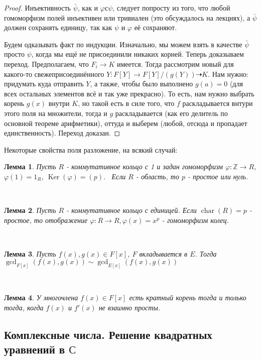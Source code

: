 \documentclass[a4paper,100pt]{article}
\theoremstyle{indented}
\newtheorem{lemma}{Лемма}
\theoremstyle{definition}
\theoremstyle{remark}
\DeclareMathOperator{\Ker}{Ker}
\DeclareMathOperator{\chard}{char}
\begin{document}
\begin{proof}
    Инъективность $\bar{\psi}$, как и $\varphi с \psi$, следует попросту из того, что любой гомоморфизм полей инъективен или тривиален (это обсуждалось на лекциях), а $\bar{\psi}$ должен сохранять единицу, так как $\psi$ и $\varphi$ её сохраняют.\ 

    Будем одказывать факт по индукции. Изначально, мы можем взять в качестве $\bar{\psi}$ просто $\psi$, когда мы ещё не присоединили никаких корней. Теперь доказываем переход. Предполагаем, что $F_i\rightarrow K$ имеется. Тогда рассмотрим новый для какого-то свежеприсоединённого $Y: F[Y]\rightarrow F[Y]/(g(Y))\dashrightarrow K$. Нам нужно: придумать куда отправить $Y$, а также, чтобы было выполнено $g(a)=0$ (для всех остальных элементов всё и так уже прекрасно). То есть, нам нужно выбрать корень $g(x)$ внутри $K$, но такой есть в силе того, что $f$ раскладывается внтури этого поля на множители, тогда и $g$ раскладывается (как его делитель по основной теореме арифметики), оттуда и выберем (любой, отсюда и пропадает единственность). Переход доказан.
\end{proof}

Некоторые свойства поля разложение, на всякий случай:\\

\begin{lemma}
    Пусть $R$ - коммутативное кольцо с 1 и задан гомоморфизм $\varphi: \mathbb{Z}\rightarrow R$, $\varphi(1)=1_R$, $\Ker(\varphi)=(p)$.  Если $R$ - область, то $p$ - простое или нуль.
\end{lemma}\

\begin{lemma}
    Пусть $R$ - коммутативное кольцо с единицей. Если $\chard (R)=p$ - простое, то отображение $\varphi: R\rightarrow R, \varphi(x)=x^p$ - гомоморфизм колец.
\end{lemma}\

\begin{lemma}
    Пусть $f(x), g(x)\in F[x]$, $F$ вкладывается в $E$. Тогда $\gcd_{F[x]}(f(x), g(x))\sim \gcd_{E[x]}(f(x), g(x))$
\end{lemma}\

\begin{lemma}
    У многочлена $f(x)\in F[x]$ есть кратный корень тогда и только тогда, когда $f(x)$ и $f'(x)$ не взаимно просты.
\end{lemma}

\resetall

\subsection{Комплексные числа. Решение квадратных уравнений в $\mathbb{С}$}
\end{document}
